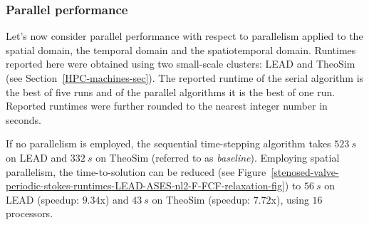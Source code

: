 \documentclass[3p]{elsarticle}
\begin{document}
\subsubsection{Parallel performance}
Let's now consider parallel performance with respect to parallelism
applied to the spatial domain, the temporal domain and the spatiotemporal domain.
Runtimes reported here were obtained using two small-scale clusters:
LEAD and TheoSim (see Section~\ref{HPC-machines-sec}).
The reported runtime of the serial algorithm is the best of five runs
and of the parallel algorithms it is the best of one run.
Reported runtimes were further rounded to the nearest integer number in seconds.

If no parallelism is employed, the sequential time-stepping algorithm
takes $523~s$ on LEAD and $332~s$ on TheoSim (referred to as \emph{baseline}).
Employing spatial parallelism, the time-to-solution can be reduced
(see Figure~\ref{stenosed-valve-periodic-stokes-runtimes-LEAD-ASES-nl2-F-FCF-relaxation-fig}) to
$56~s$ on LEAD (speedup: $9.34$x) and $43~s$ on TheoSim (speedup: $7.72$x),
using $16$ processors.
\end{document}
